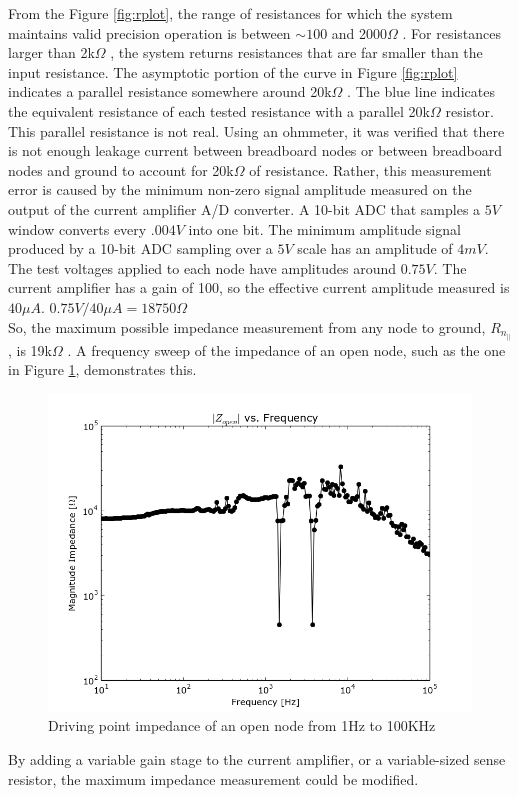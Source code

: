 \documentclass[11pt,twoside]{mitthesis}
\newcommand{\ohm}{$\Omega$ }
\begin{document}
From the Figure \ref{fig:rplot}, the range of resistances for which the system maintains valid precision operation is between $\sim100$ and 2000\ohm.
For resistances larger than 2k\ohm, the system returns resistances that are far smaller than the input resistance.
The asymptotic portion of the curve in Figure \ref{fig:rplot} indicates a parallel resistance somewhere around 20k\ohm.
The blue line indicates the equivalent resistance of each tested resistance with a parallel 20k\ohm resistor.
This parallel resistance is not real.
Using an ohmmeter, it was verified that there is not enough leakage current between breadboard nodes or between breadboard nodes and ground to account for 20k\ohm of resistance.
Rather, this measurement error is caused by the minimum non-zero signal amplitude measured on the output of the current amplifier A/D converter.
A 10-bit ADC that samples a $5V$ window converts every $.004V$ into one bit.
The minimum amplitude signal produced by a 10-bit ADC sampling over a $5V$ scale has an amplitude of $4mV$.
The test voltages applied to each node have amplitudes around $0.75V$.
The current amplifier has a gain of 100, so the effective current amplitude measured is $40\mu A$. 
\quad \qquad \qquad \qquad \qquad \qquad $0.75V / 40\mu A=18750\Omega$\\
So, the maximum possible impedance measurement from any node to ground, $R_{n_{||}}$, is 19k\ohm.
A frequency sweep of the impedance of an open node, such as the one in Figure \ref{fig:zopen}, demonstrates this.
\begin{figure}[H]
	\label{fig:zopen}
  \begin{center}
      \includegraphics[width=.7\textwidth]{../zopen-gnd.png}
      \caption{Driving point impedance of an open node from 1Hz to 100KHz}
  \end{center}
\end{figure}
By adding a variable gain stage to the current amplifier, or a variable-sized sense resistor, the maximum impedance measurement could be modified.
\end{document}
